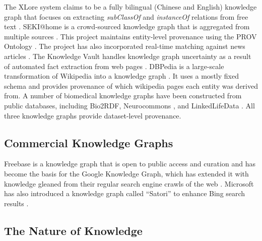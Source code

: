 The XLore system claims to be a fully bilingual (Chinese and English) knowledge graph that focuses on extracting \emph{subClassOf} and \emph{instanceOf} relations from free text \cite{wang2013xlore}.
SEKI@home is a crowd-sourced knowledge graph that is aggregated from multiple sources \cite{steiner2012seki}.
This project maintains entity-level provenance using the PROV Ontology \cite{Moreau_2015}.
The project has also incorporated real-time matching against news articles \cite{steiner_iswc_2012}.
The Knowledge Vault handles knowledge graph uncertainty as a result of automated fact extraction from web pages \cite{Dong_2014}.
DBPedia is a large-scale transformation of Wikipedia into a knowledge graph \cite{Bizer_2009}.
It uses a mostly fixed schema and provides provenance of which wikipedia pages each entity was derived from.
A number of biomedical knowledge graphs have been constructed from public databases, including Bio2RDF\cite{Callahan_2013}, Neurocommons \cite{Ruttenberg_2009}, and LinkedLifeData \cite{momtchev2009expanding}.
All three knowledge graphs provide dataset-level provenance.

\subsection{Commercial Knowledge Graphs}
Freebase is a knowledge graph that is open to public access and curation \cite{Bollacker_2008} and has become the basis for the Google Knowledge Graph, which has extended it with knowledge gleaned from their regular search engine crawls of the web \cite{singhal2012introducing}.
Microsoft has also introduced a knowledge graph called ``Satori'' to enhance Bing search results \cite{qian2013understand}.



\subsection{The Nature of Knowledge}

